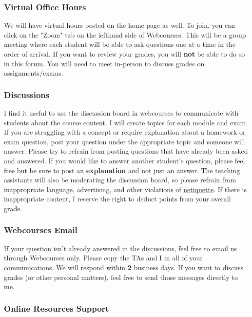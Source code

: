 \documentclass[11pt]{paper}
\begin{document}
\subsubsection{Virtual Office Hours}

We will have virtual hours posted on the home page as well. To join, you can click on the "Zoom" tab on the lefthand side of Webcourses. This will be a group meeting where each student will be able to ask questions one at a time in the order of arrival. If you want to review your grades, you will \textbf{not} be able to do so in this forum. You will need to meet in-person to discuss grades on assignments/exams.

\subsubsection{Discussions}

I find it useful to use the discussion board in webcourses to communicate with students about the course content. I will create topics for each module and exam.  If you are struggling with a concept or require explanation about a homework or exam question, post your question under the appropriate topic and someone will answer. Please try to refrain from posting questions that have already been asked and answered.  If you would like to answer another student’s question, please feel free but be sure to post an \textbf{explanation} and not just an answer. The teaching assistants will also be moderating the discussion board, so please refrain from inappropriate language, advertising, and other violations of \href{https://www.rasmussen.edu/student-experience/college-life/netiquette-guidelines-every-online-student-needs-to-know/}{netiquette}. If there is inappropriate content, I reserve the right to deduct points from your overall grade.

\subsubsection{Webcourses Email}

If your question isn't already answered in the discussions, feel free to email us through Webcourses only. Please copy the TAs and I in all of your communications. We will respond within \textbf{2} business days. If you want to discuss grades (or other personal matters), feel free to send those messages directly to me.

\subsubsection{Online Resources Support} \label{sec:toolsupport}
\end{document}
